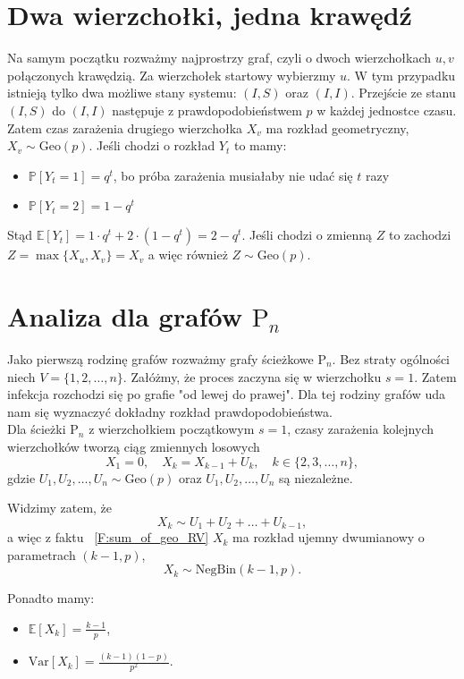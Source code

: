 \section{Dwa wierzchołki, jedna krawędź}

Na samym początku rozważmy najprostrzy graf, czyli o dwoch wierzchołkach $u,v$ połączonych krawędzią. Za wierzchołek startowy wybierzmy $u$. W tym przypadku istnieją tylko dwa możliwe stany systemu: $(I,S)$ oraz $(I,I)$. Przejście ze stanu $(I, S)$ do $(I, I)$ następuje z prawdopodobieństwem $p$ w każdej jednostce czasu. Zatem czas zarażenia drugiego wierzchołka $X_v$ ma rozkład geometryczny, $X_v \sim \mathrm{Geo}(p)$. Jeśli chodzi o rozkład $Y_t$ to mamy:
\begin{itemize}
    \item $\mathbb{P}[Y_t=1]=q^t$, bo próba zarażenia musiałaby nie udać się $t$ razy
    \item $\mathbb{P}[Y_t=2]=1-q^t$
\end{itemize}
Stąd $\mathbb{E}[Y_t]=1\cdot q^t + 2 \cdot (1-q^t) = 2-q^t$. Jeśli chodzi o zmienną $Z$ to zachodzi $Z=\max\{X_u,X_v\}=X_v$ a więc również $Z\sim \mathrm{Geo}(p)$.

\section{Analiza dla grafów $\mathrm{P}_n$}

Jako pierwszą rodzinę grafów rozważmy grafy ścieżkowe $\mathrm{P}_n$. Bez straty ogólności niech $V=\{1,2,\dots,n\}$. Załóżmy, że proces zaczyna się w wierzchołku $s=1$. Zatem infekcja rozchodzi się po grafie "od lewej do prawej". Dla tej rodziny grafów uda nam się wyznaczyć dokładny rozkład prawdopodobieństwa. \\
Dla ścieżki $\mathrm{P}_n$ z wierzchołkiem początkowym $s=1$,  
czasy zarażenia kolejnych wierzchołków tworzą ciąg zmiennych losowych
\[
X_1 = 0, \quad X_{k} = X_{k-1} + U_k, \quad k\in\{2,3,\dots,n\},
\]
gdzie $U_1,U_2,\dots,U_n \sim \mathrm{Geo}(p)$ oraz $U_1,U_2,\dots,U_n$ są niezależne. 

Widzimy zatem, że
\[
X_k \sim U_1 + U_2 + \dots + U_{k-1},
\]
a więc z faktu ~\ref{F:sum_of_geo_RV} $X_k$ ma rozkład ujemny dwumianowy o parametrach $(k-1, p)$, 
\[
X_k\sim \mathrm{NegBin}(k-1, p).
\]

Ponadto mamy:
\begin{itemize}
    \item $\mathbb{E}[X_k] = \frac{k-1}{p}$,
    \item $\mathrm{Var}[X_k] = \frac{(k-1)(1-p)}{p^2}$.
\end{itemize}

